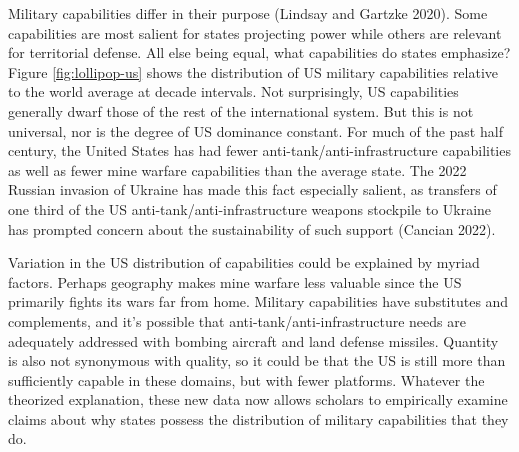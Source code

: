 \documentclass[
]{article}
\begin{document}
Military capabilities differ in their purpose (Lindsay and Gartzke 2020). Some capabilities are most salient for states projecting power while others are relevant for territorial defense. All else being equal, what capabilities do states emphasize? Figure \ref{fig:lollipop-us} shows the distribution of US military capabilities relative to the world average at decade intervals. Not surprisingly, US capabilities generally dwarf those of the rest of the international system. But this is not universal, nor is the degree of US dominance constant. For much of the past half century, the United States has had fewer anti-tank/anti-infrastructure capabilities as well as fewer mine warfare capabilities than the average state. The 2022 Russian invasion of Ukraine has made this fact especially salient, as transfers of one third of the US anti-tank/anti-infrastructure weapons stockpile to Ukraine has prompted concern about the sustainability of such support (Cancian 2022).

Variation in the US distribution of capabilities could be explained by myriad factors. Perhaps geography makes mine warfare less valuable since the US primarily fights its wars far from home. Military capabilities have substitutes and complements, and it's possible that anti-tank/anti-infrastructure needs are adequately addressed with bombing aircraft and land defense missiles. Quantity is also not synonymous with quality, so it could be that the US is still more than sufficiently capable in these domains, but with fewer platforms. Whatever the theorized explanation, these new data now allows scholars to empirically examine claims about why states possess the distribution of military capabilities that they do.
\end{document}
